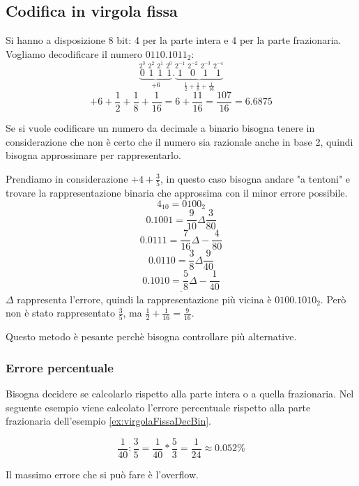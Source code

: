 \documentclass[a4paper]{article}
\theoremstyle{break}
\theoremstyle{break}
\theoremstyle{break}
\theoremstyle{break}
\begin{document}
\subsection{Codifica in virgola fissa}
\begin{example}
	Si hanno a disposizione 8 bit: 4 per la parte intera e 4 per la parte frazionaria.
	Vogliamo decodificare il numero \( 0110.1011_2 \):
	\Large\[
		\underbrace{\stackrel{2^{3}}{0}\;\stackrel{2^{2}}{1}\;\stackrel{2^{1}}{1}\;\stackrel{2^{0}}{1}}_{+6} .
		\underbrace{\stackrel{2^{-1}}{1}\;\stackrel{2^{-2}}{0}\;\stackrel{2^{-3}}{1}\;\stackrel{2^{-4}}{1}}_{\frac{1}{2}+\frac{1}{8}+\frac{1}{16}}
	\]
	\normalsize\[
		+6 + \frac{1}{2}+\frac{1}{8}+\frac{1}{16}= 6+\frac{11}{16} = \frac{107}{16} = 6.6875
	\]
\end{example}
Se si vuole codificare un numero da decimale a binario bisogna tenere in considerazione
che non è certo che il numero sia razionale anche in base 2, quindi bisogna
approssimare per rappresentarlo.

\begin{example}
	\label{ex:virgolaFissaDecBin}
	Prendiamo in considerazione \( +4 +\frac{3}{5} \), in questo caso bisogna andare
	"a tentoni" e trovare la rappresentazione binaria che approssima con il minor
	errore possibile.
	\[
		4_{10} = 0100_2
	\]
	\[
		0.1001 = \frac{9}{10} \Delta \frac{3}{80}
	\]
	\[
		0.0111 = \frac{7}{16} \Delta -\frac{4}{80}
	\]
	\[
		0.0110 = \frac{3}{8} \Delta \frac{9}{40}
	\]
	\[
		\underline{0.1010 = \frac{5}{8} \Delta -\frac{1}{40}}
	\]
	\( \Delta \) rappresenta l'errore, quindi la rappresentazione più vicina è
	\( 0100.1010_2 \). Però non è stato rappresentato \( \frac{3}{5} \), ma
	\( \frac{1}{2}+\frac{1}{16}=\frac{9}{16} \).
\end{example}
Questo metodo è pesante perchè bisogna controllare più alternative.

\subsubsection{Errore percentuale}
Bisogna decidere se calcolarlo rispetto alla parte intera o a quella frazionaria.
Nel seguente esempio viene calcolato l'errore percentuale rispetto alla parte
frazionaria dell'esempio \ref{ex:virgolaFissaDecBin}.
\begin{example}
	\[
		\frac{1}{40} : \frac{3}{5} = \frac{1}{40} * \frac{5}{3} = \frac{1}{24} \approx 0.052\%
	\]
\end{example}
Il massimo errore che si può fare è l'overflow.
\end{document}
